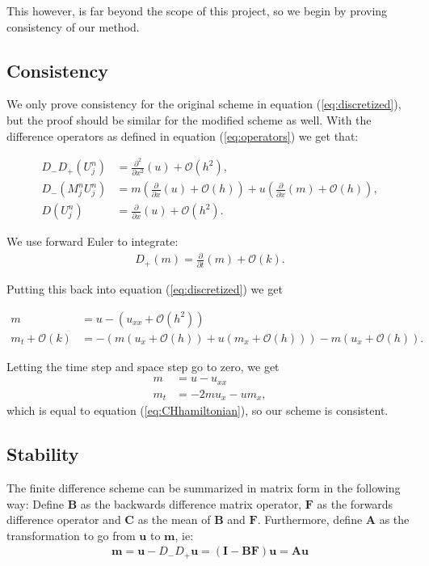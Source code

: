 This however, is far beyond the scope of this project, so we begin by proving consistency of our method.

\subsection*{Consistency}
We only prove consistency for the original scheme in equation (\ref{eq:discretized}), but the proof should be similar for the modified scheme as well. With the difference operators as defined in equation (\ref{eq:operators}) we get that:

\begin{align*}
D_- D_+ \left( U_j^n \right)  &= \frac{\partial^2}{\partial x^2} (u) + \mathcal{O} \left( h^ 2 \right), \\
 D_- \left(M_j^n U_j^n \right) &= m \left( \frac{\partial}{\partial x} (u) + \mathcal{O}(h) \right) + u \left( \frac{\partial}{\partial x} (m) + \mathcal{O} \left( h \right) \right),  \\
D \left(U_j^n \right) &= \frac{\partial}{\partial x} (u) + \mathcal{O} \left( h^2 \right).
\end{align*}

We use forward Euler to integrate:
\begin{align*}
D_+ (m) =  \frac{\partial}{\partial t} (m) + \mathcal{O}(k).
\end{align*}

Putting this back into equation (\ref{eq:discretized}) we get

\begin{align*}
m &= u - \left( u_{xx} + \mathcal{O}\left(h^2\right) \right) \\
m_t  + \mathcal{O}(k) &= - \left( m \left( u_x + \mathcal{O}(h) \right) +  u \left( m_x + \mathcal{O}(h) \right)  \right) - m \left( u_x + \mathcal{O}(h) \right).
\end{align*}

Letting the time step and space step go to zero, we get
\begin{align*}
m &= u - u_{xx} \\
m_t &= - 2m u_x - u m_x,
\end{align*}
which is equal to equation (\ref{eq:CHhamiltonian}), so our scheme is consistent. 

\subsection*{Stability}
The finite difference scheme can be summarized in matrix form in the following way:
Define $\bm{B}$ as the backwards difference matrix operator, $\bm{F}$ as the forwards difference operator and $\bm{C}$ as the mean of $\bm{B}$ and $\bm{F}$. Furthermore, define $\bm{A}$ as the transformation to go from $\bm{u}$ to $\bm{m}$, ie:
\begin{align*}
\bm{m} = \bm{u}-D_-D_+\bm{u} = (\bm{I}-\bm{BF})\bm{u} = \bm{A} \bm{u}
\end{align*} 


